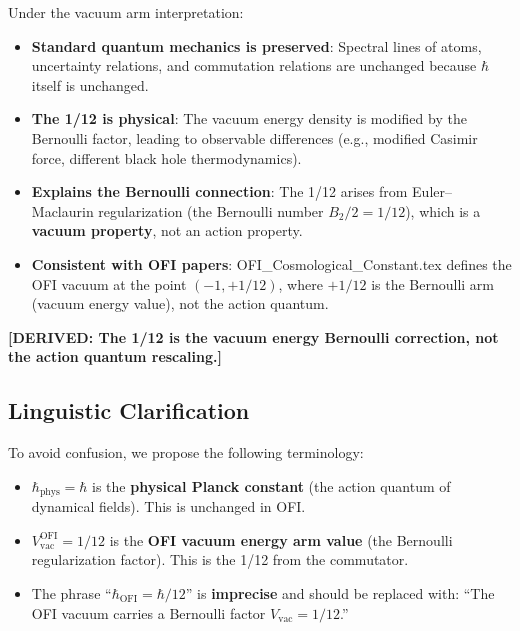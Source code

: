\documentclass[12pt]{article}
\theoremstyle{definition}
\newcommand{\DERIVED}[1]{\textcolor{derivedcolor}{\textbf{[DERIVED: #1]}}}
\begin{document}
Under the vacuum arm interpretation:
\begin{itemize}
  \item \textbf{Standard quantum mechanics is preserved}: Spectral lines of atoms,
    uncertainty relations, and commutation relations are unchanged because $\hbar$
    itself is unchanged.

  \item \textbf{The 1/12 is physical}: The vacuum energy density is modified by the
    Bernoulli factor, leading to observable differences (e.g., modified Casimir force,
    different black hole thermodynamics).

  \item \textbf{Explains the Bernoulli connection}: The 1/12 arises from
    Euler--Maclaurin regularization (the Bernoulli number $B_2/2 = 1/12$), which is
    a \textbf{vacuum property}, not an action property.

  \item \textbf{Consistent with OFI papers}: OFI_Cosmological_Constant.tex defines
    the OFI vacuum at the point $(-1, +1/12)$, where $+1/12$ is the Bernoulli arm
    (vacuum energy value), not the action quantum.
\end{itemize}

\DERIVED{The 1/12 is the vacuum energy Bernoulli correction, not the action quantum
rescaling.}

\subsection{Linguistic Clarification}

To avoid confusion, we propose the following terminology:
\begin{itemize}
  \item $\hbar_{\mathrm{phys}} = \hbar$ is the \textbf{physical Planck constant} (the
    action quantum of dynamical fields). This is unchanged in OFI.

  \item $V_{\mathrm{vac}}^{\mathrm{OFI}} = 1/12$ is the \textbf{OFI vacuum energy arm value}
    (the Bernoulli regularization factor). This is the 1/12 from the commutator.

  \item The phrase ``$\hbar_{\mathrm{OFI}} = \hbar/12$'' is \textbf{imprecise} and should
    be replaced with: ``The OFI vacuum carries a Bernoulli factor $V_{\mathrm{vac}} = 1/12$.''
\end{itemize}
\end{document}
